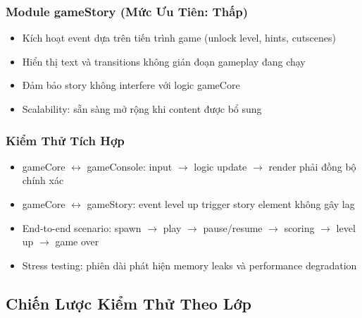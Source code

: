 \documentclass[12pt,a4paper]{article}
\begin{document}
\subsubsection{Module gameStory \textnormal{(Mức Ưu Tiên: Thấp)}}
\begin{itemize}[leftmargin=3em]
  \item Kích hoạt event dựa trên tiến trình game (unlock level, hints, cutscenes)
  \item Hiển thị text và transitions không gián đoạn gameplay đang chạy
  \item Đảm bảo story không interfere với logic gameCore
  \item Scalability: sẵn sàng mở rộng khi content được bổ sung
\end{itemize}

\subsubsection{Kiểm Thử Tích Hợp}
\begin{itemize}[leftmargin=3em]
  \item gameCore $\leftrightarrow$ gameConsole: input $\rightarrow$ logic update $\rightarrow$ render phải đồng bộ chính xác
  \item gameCore $\leftrightarrow$ gameStory: event level up trigger story element không gây lag
  \item End-to-end scenario: spawn $\rightarrow$ play $\rightarrow$ pause/resume $\rightarrow$ scoring $\rightarrow$ level up $\rightarrow$ game over
  \item Stress testing: phiên dài phát hiện memory leaks và performance degradation
\end{itemize}

\subsection{Chiến Lược Kiểm Thử Theo Lớp}

\end{document}
